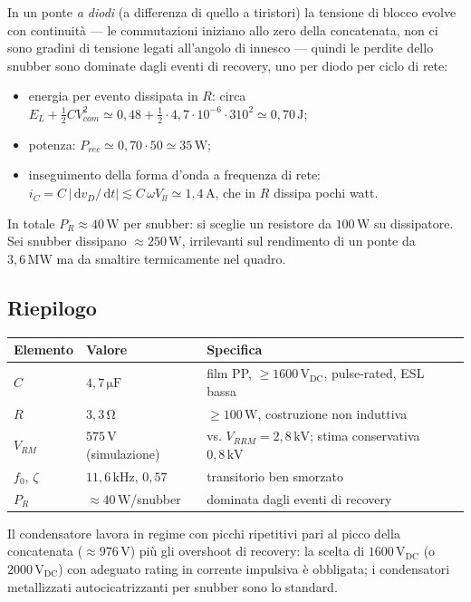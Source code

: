 \documentclass[11pt,a4paper]{article}
\newcommand{\ud}{\,\mathrm{d}}
\newcommand{\unit}[1]{\,\mathrm{#1}}
\begin{document}
In un ponte \emph{a diodi} (a differenza di quello a tiristori) la
tensione di blocco evolve con continuit\`a --- le commutazioni iniziano
allo zero della concatenata, non ci sono gradini di tensione legati
all'angolo di innesco --- quindi le perdite dello snubber sono dominate
dagli eventi di recovery, uno per diodo per ciclo di rete:
\begin{itemize}
\item energia per evento dissipata in $R$: circa
$E_L + \tfrac{1}{2}C V_{com}^2
\simeq 0{,}48 + \tfrac{1}{2}\cdot4{,}7\cdot10^{-6}\cdot310^2
\simeq 0{,}70\unit{J}$;
\item potenza: $P_{rec} \simeq 0{,}70 \cdot 50 \simeq 35\unit{W}$;
\item inseguimento della forma d'onda a frequenza di rete:
$i_C = C\,|\ud v_D/\ud t| \lesssim C\,\omega\hat{V}_{ll} \simeq 1{,}4\unit{A}$,
che in $R$ dissipa pochi watt.
\end{itemize}
In totale $P_R \approx 40\unit{W}$ per snubber: si sceglie un resistore da
$100\unit{W}$ su dissipatore. Sei snubber dissipano
$\approx 250\unit{W}$, irrilevanti sul rendimento di un ponte da
$3{,}6\unit{MW}$ ma da smaltire termicamente nel quadro.

\subsection{Riepilogo}

\begin{center}
\begin{tabular}{lll}
\toprule
Elemento & Valore & Specifica \\
\midrule
$C$ & $4{,}7\unit{\mu F}$ & film PP, $\ge 1600\unit{V_{DC}}$, pulse-rated, ESL bassa \\
$R$ & $3{,}3\unit{\Omega}$ & $\ge 100\unit{W}$, costruzione non induttiva \\
$V_{RM}$ & $575\unit{V}$ (simulazione) & vs. $V_{RRM}=2{,}8\unit{kV}$; stima conservativa $0{,}8\unit{kV}$ \\
$f_0$, $\zeta$ & $11{,}6\unit{kHz}$, $0{,}57$ & transitorio ben smorzato \\
$P_R$ & $\approx 40\unit{W}$/snubber & dominata dagli eventi di recovery \\
\bottomrule
\end{tabular}
\end{center}

Il condensatore lavora in regime con picchi ripetitivi pari al picco della
concatenata ($\approx 976\unit{V}$) pi\`u gli overshoot di recovery: la
scelta di $1600\unit{V_{DC}}$ (o $2000\unit{V_{DC}}$) con adeguato rating
in corrente impulsiva \`e obbligata; i condensatori metallizzati
autocicatrizzanti per snubber sono lo standard.
\end{document}
